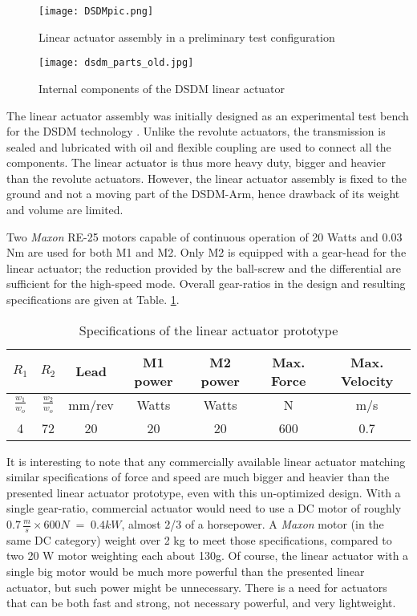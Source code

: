 \begin{figure}[htp]
	\centering
		\texttt{[image: DSDMpic.png]}
	\caption{Linear actuator assembly in a preliminary test configuration} 
	\label{fig:linact}
\end{figure}

\begin{figure}[htbp]
	\centering
		\texttt{[image: dsdm\_parts\_old.jpg]}
	\caption{Internal components of the DSDM linear actuator}
	\label{fig:dsdm_parts_old}
\end{figure}

The linear actuator assembly was initially designed as an experimental test bench for the DSDM technology \cite{girard_two-speed_2015}. Unlike the revolute actuators, the transmission is sealed and lubricated with oil and flexible coupling are used to connect all the components.  The linear actuator is thus more heavy duty, bigger and heavier than the revolute actuators. However, the linear actuator assembly is fixed to the ground and not a moving part of the DSDM-Arm, hence drawback of its weight and volume are limited. 

Two \textit{Maxon} RE-25 motors capable of continuous operation of 20 Watts and 0.03 Nm are used for both M1 and M2. Only M2 is equipped with a gear-head for the linear actuator; the reduction provided by the ball-screw and the differential are sufficient for the high-speed mode. Overall gear-ratios in the design and resulting specifications are given at Table. \ref{tab:specrev}.

\begin{table}[htbp]
	\centering
	\caption{Specifications of the linear actuator prototype}
		\begin{tabular}{ c c c c c c c }
			\hline
			$R_1$ & $R_2$ & Lead & M1 power & M2 power & Max. Force & Max. Velocity \\
			\hline
			$\frac{w_1}{w_o}$ & $\frac{w_2}{w_o}$ & mm/rev &Watts & Watts & N & m/s \\
			\hline \hline
			4 & 72 & 20 & 20 & 20 & 600 & 0.7 \\
			\hline
		\end{tabular}
	\label{tab:specrev}
\end{table}

It is interesting to note that any commercially available linear actuator matching similar specifications of force and speed are much bigger and heavier than the presented linear actuator prototype, even with this un-optimized design. With a single gear-ratio, commercial actuator would need to use a DC motor of roughly $0.7 \, \frac{m}{s} \times 600 N \; = \; 0.4 kW $, almost 2/3 of a horsepower. A \textit{Maxon} motor (in the same DC category) weight over 2 kg to meet those specifications, compared to two 20 W motor weighting each about 130g. Of course, the linear actuator with a single big motor would be much more powerful than the presented linear actuator, but such power might be unnecessary. There is a need for actuators that can be both fast and strong, not necessary powerful, and very lightweight. 


